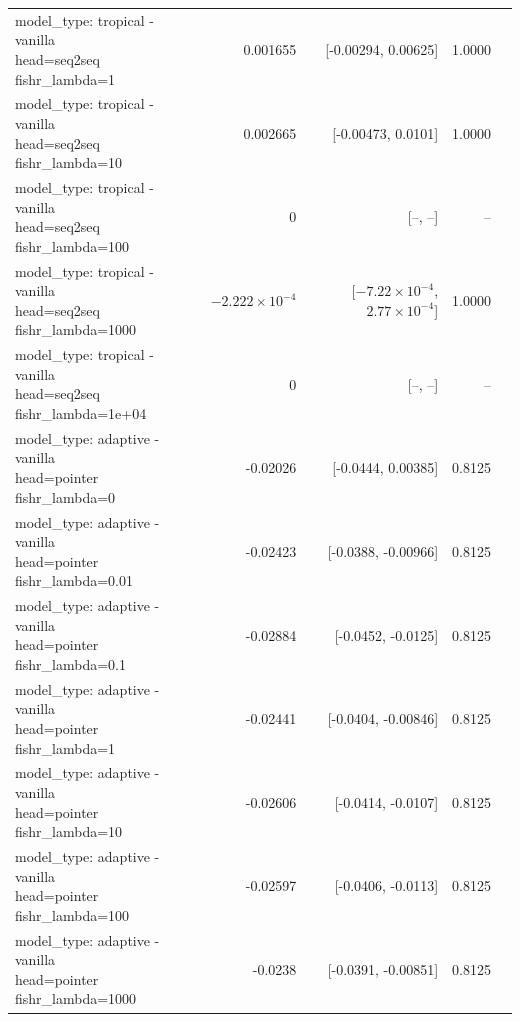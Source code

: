 \documentclass[10pt]{article}
\makeatletter
\newcommand{\stackcell}[1]{\begin{tabular}[t]{@{}l@{}}#1\end{tabular}}
\makeatother
\begin{document}
{\begin{longtable}{lrrrl}
\stackcell{model\_type: tropical - vanilla\\\footnotesize head=seq2seq fishr\_lambda=1 } & 0.001655 & [-0.00294, 0.00625] & 1.0000 & \\
\stackcell{model\_type: tropical - vanilla\\\footnotesize head=seq2seq fishr\_lambda=10 } & 0.002665 & [-0.00473, 0.0101] & 1.0000 & \\
\stackcell{model\_type: tropical - vanilla\\\footnotesize head=seq2seq fishr\_lambda=100 } & 0 & [--, --] & -- & \\
\stackcell{model\_type: tropical - vanilla\\\footnotesize head=seq2seq fishr\_lambda=1000 } & $-2.222\times10^{-4}$ & [$-7.22\times10^{-4}$, $2.77\times10^{-4}$] & 1.0000 & \\
\stackcell{model\_type: tropical - vanilla\\\footnotesize head=seq2seq fishr\_lambda=1e+04 } & 0 & [--, --] & -- & \\
\stackcell{model\_type: adaptive - vanilla\\\footnotesize head=pointer fishr\_lambda=0 } & -0.02026 & [-0.0444, 0.00385] & 0.8125 & \\
\stackcell{model\_type: adaptive - vanilla\\\footnotesize head=pointer fishr\_lambda=0.01 } & -0.02423 & [-0.0388, -0.00966] & 0.8125 & \\
\stackcell{model\_type: adaptive - vanilla\\\footnotesize head=pointer fishr\_lambda=0.1 } & -0.02884 & [-0.0452, -0.0125] & 0.8125 & \\
\stackcell{model\_type: adaptive - vanilla\\\footnotesize head=pointer fishr\_lambda=1 } & -0.02441 & [-0.0404, -0.00846] & 0.8125 & \\
\stackcell{model\_type: adaptive - vanilla\\\footnotesize head=pointer fishr\_lambda=10 } & -0.02606 & [-0.0414, -0.0107] & 0.8125 & \\
\stackcell{model\_type: adaptive - vanilla\\\footnotesize head=pointer fishr\_lambda=100 } & -0.02597 & [-0.0406, -0.0113] & 0.8125 & \\
\stackcell{model\_type: adaptive - vanilla\\\footnotesize head=pointer fishr\_lambda=1000 } & -0.0238 & [-0.0391, -0.00851] & 0.8125 & \\

\end{longtable}}
\end{document}
